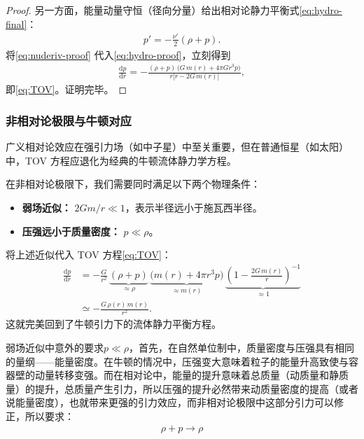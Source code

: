 \begin{proof}
另一方面，能量动量守恒（径向分量）给出相对论静力平衡式\eqref{eq:hydro-final}：
\begin{align}
p'=-\frac{\nu'}{2}(\rho+p).\label{eq:hydro-proof}
\end{align}
将\eqref{eq:nuderiv-proof} 代入\eqref{eq:hydro-proof}，立刻得到
\begin{align}
\frac{\mathrm{d}p}{\mathrm{d}r}
=-\frac{(\rho+p)\,\bigl(G\,m(r)+4\pi G r^{3}p\bigr)}{r\bigl[r-2G\,m(r)\bigr]},\nonumber
\end{align}
即\eqref{eq:TOV}。证明完毕。
\end{proof}

\subsubsection{非相对论极限与牛顿对应}

广义相对论效应在强引力场（如中子星）中至关重要，但在普通恒星（如太阳）中，TOV 方程应退化为经典的牛顿流体静力学方程。

在非相对论极限下，我们需要同时满足以下两个物理条件：
\begin{itemize}
    \item \textbf{弱场近似：}  $2Gm/r \ll 1$，表示半径远小于施瓦西半径。
    \item \textbf{压强远小于质量密度：} $p \ll \rho$。
\end{itemize}

将上述近似代入 TOV 方程\eqref{eq:TOV}：
\begin{align}
\frac{\mathrm{d}p}{\mathrm{d}r}
&=-\frac{G}{r^{2}}\,\underbrace{(\rho+p)}_{\approx \rho}\,
\underbrace{\bigl(m(r)+4\pi r^{3}p\bigr)}_{\approx m(r)}\,
\underbrace{\left(1-\frac{2G\,m(r)}{r}\right)^{-1}}_{\approx 1} \nonumber \\
&\simeq -\frac{G\,\rho(r)\,m(r)}{r^{2}}. \label{eq:newton-limit}
\end{align}
这就完美回到了牛顿引力下的流体静力平衡方程。

\begin{derivationnote}[压强在爱因斯坦与牛顿引力中的作用]
    弱场近似中意外的要求$p \ll \rho$，首先，在自然单位制中，质量密度与压强具有相同的量纲——能量密度。在牛顿的情况中，压强变大意味着粒子的能量升高致使与容器壁的动量转移变强。而在相对论中，能量的提升意味着总质量（动质量和静质量）的提升，总质量产生引力，所以压强的提升必然带来动质量密度的提高（或者说能量密度），也就带来更强的引力效应，而非相对论极限中这部分引力可以修正，所以要求：
    \begin{align}
        \rho +p \rightarrow \rho
    \end{align}
\end{derivationnote}
